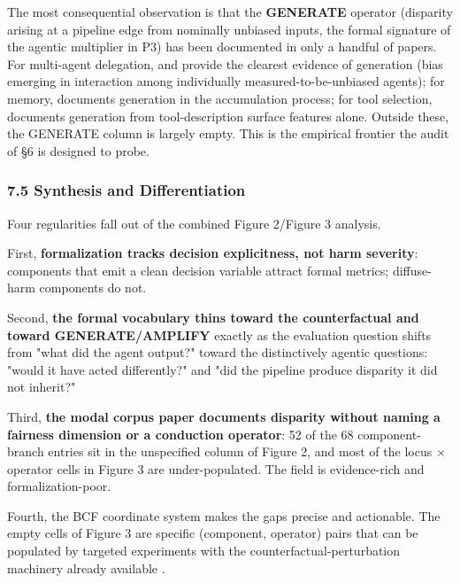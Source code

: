 \documentclass[10pt]{article}
\begin{document}
The most consequential observation is that the \textbf{GENERATE} operator (disparity arising at a pipeline edge from nominally unbiased inputs, the formal signature of the agentic multiplier in P3) has been documented in only a handful of papers. For multi-agent delegation, \cite{nguyen2025social} and \cite{madigan2025emergent} provide the clearest evidence of generation (bias emerging in interaction among individually measured-to-be-unbiased agents); for memory, \cite{ma2026implicit} documents generation in the accumulation process; for tool selection, \cite{blankenstein2025biasbusters} documents generation from tool-description surface features alone. Outside these, the GENERATE column is largely empty. This is the empirical frontier the audit of \S{}6 is designed to probe.

\subsubsection*{7.5 Synthesis and Differentiation}

Four regularities fall out of the combined Figure 2/Figure 3 analysis.

First, \textbf{formalization tracks decision explicitness, not harm severity}: components that emit a clean decision variable attract formal metrics; diffuse-harm components do not.

Second, \textbf{the formal vocabulary thins toward the counterfactual and toward GENERATE/AMPLIFY} exactly as the evaluation question shifts from "what did the agent output?" toward the distinctively agentic questions: "would it have acted differently?" and "did the pipeline produce disparity it did not inherit?"

Third, \textbf{the modal corpus paper documents disparity without naming a fairness dimension or a conduction operator}: 52 of the 68 component-branch entries sit in the unspecified column of Figure 2, and most of the locus $\times$ operator cells in Figure 3 are under-populated. The field is evidence-rich and formalization-poor.

Fourth, the BCF coordinate system makes the gaps precise and actionable. The empty cells of Figure 3 are specific (component, operator) pairs that can be populated by targeted experiments with the counterfactual-perturbation machinery already available \cite{parziale2025systematic,mayilvaghanan2026counterfactual,basu2026names}.
\end{document}
